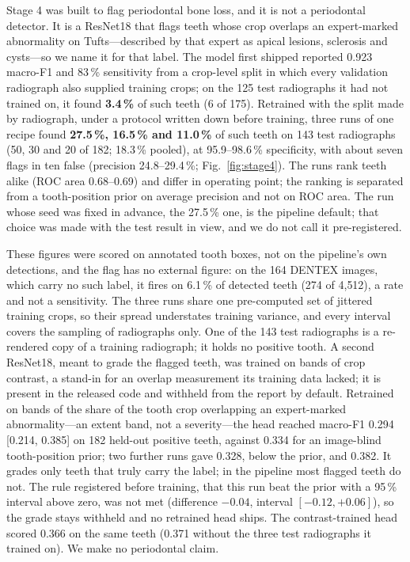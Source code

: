 \documentclass[conference]{IEEEtran}
\begin{document}
Stage 4 was built to flag periodontal bone loss, and it is not a periodontal
detector. It is a ResNet18 that flags teeth whose crop overlaps an
expert-marked abnormality on Tufts---described by that expert as apical lesions,
sclerosis and cysts---so we name it for that label. The model first shipped
reported 0.923 macro-F1 and 83\,\% sensitivity from a crop-level split in which
every validation radiograph also supplied training crops; on the 125 test
radiographs it had not trained on, it found \textbf{3.4\,\%} of such teeth (6 of
175). Retrained with the split made by radiograph, under a protocol written down
before training, three runs of one recipe found \textbf{27.5\,\%, 16.5\,\% and
11.0\,\%} of such teeth on 143 test radiographs (50, 30 and 20 of 182; 18.3\,\%
pooled), at 95.9--98.6\,\% specificity, with about seven flags in ten false
(precision 24.8--29.4\,\%; Fig.~\ref{fig:stage4}). The runs rank teeth alike
(ROC area 0.68--0.69) and differ in operating point; the ranking is separated from
a tooth-position prior on average precision and not on ROC area. The run whose
seed was fixed in advance, the 27.5\,\% one, is the pipeline default; that choice
was made with the test result in view, and we do not call it pre-registered.

These figures were scored on annotated tooth boxes, not on the pipeline's own
detections, and the flag has no external figure: on the 164 DENTEX images, which
carry no such label, it fires on 6.1\,\% of detected teeth (274 of 4{,}512), a
rate and not a sensitivity. The three runs share one pre-computed set of jittered
training crops, so their spread understates training variance, and every interval
covers the sampling of radiographs only. One of the 143 test radiographs is a
re-rendered copy of a training radiograph; it holds no positive tooth. A second
ResNet18, meant to grade the flagged teeth, was trained on bands of crop contrast,
a stand-in for an overlap measurement its training data lacked; it is present in
the released code and withheld from the report by default. Retrained on bands of
the share of the tooth crop overlapping an expert-marked abnormality---an extent
band, not a severity---the head reached macro-F1 0.294 [0.214, 0.385] on 182
held-out positive teeth, against 0.334 for an image-blind tooth-position prior;
two further runs gave 0.328, below the prior, and 0.382. It grades only teeth
that truly carry the label; in the pipeline most flagged teeth do not. The rule
registered before training, that this run beat the prior with a 95\,\% interval
above zero, was not met (difference $-0.04$, interval $[-0.12, +0.06]$), so the
grade stays withheld and no retrained head ships. The contrast-trained head
scored 0.366 on the same teeth (0.371 without the three test radiographs it
trained on). We make no periodontal claim.
\end{document}

